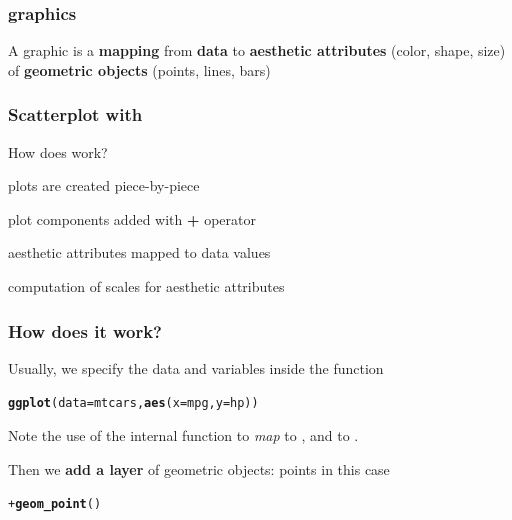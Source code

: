 \documentclass[12pt]{beamer}\usepackage[]{graphicx}\usepackage[]{color}
\makeatletter
\newcommand{\hlopt}[1]{\textcolor[rgb]{0,0,0}{#1}}%
\newcommand{\hlstd}[1]{\textcolor[rgb]{0.345,0.345,0.345}{#1}}%
\newcommand{\hlkwc}[1]{\textcolor[rgb]{0.333,0.667,0.333}{#1}}%
\newcommand{\hlkwd}[1]{\textcolor[rgb]{0.737,0.353,0.396}{\textbf{#1}}}%
\newenvironment{kframe}{%
 \def\at@end@of@kframe{}%
 \ifinner\ifhmode%
  \def\at@end@of@kframe{\end{minipage}}%
  \begin{minipage}{\columnwidth}%
 \fi\fi%
 \def\FrameCommand##1{\hskip\@totalleftmargin \hskip-\fboxsep
 \colorbox{shadecolor}{##1}\hskip-\fboxsep
     \hskip-\linewidth \hskip-\@totalleftmargin \hskip\columnwidth}%
 \MakeFramed {\advance\hsize-\width
   \@totalleftmargin\z@ \linewidth\hsize
   \@setminipage}}%
 {\par\unskip\endMakeFramed%
 \at@end@of@kframe}
\newenvironment{knitrout}{}{} %
\makeatother
\begin{document}

\begin{frame}
\frametitle{ graphics}

A graphic is a {\hilit \textbf{mapping}} from \textbf{data} to \textbf{aesthetic attributes} (color, shape, size) of \textbf{geometric objects} (points, lines, bars)
\eb

\bi
  \item {}
  \item {}
  \item {}
\ei

\end{frame}


\begin{frame}[fragile]
\frametitle{Scatterplot with }

How does  work?
\bi
  \item plots are created piece-by-piece
  \item plot components added with {\hilit \textbf{+}} operator
  \item aesthetic attributes mapped to data values
  \item computation of scales for aesthetic attributes
\ei

\end{frame}


\begin{frame}[fragile]
\frametitle{How does it work?}
Usually, we specify the data and variables inside the function {\hilit {}} 
\begin{knitrout}\footnotesize
{}\color{fgcolor}\begin{kframe}
\begin{alltt}
\hlkwd{ggplot}\hlstd{(}\hlkwc{data} \hlstd{= mtcars,} \hlkwd{aes}\hlstd{(}\hlkwc{x} \hlstd{= mpg,} \hlkwc{y} \hlstd{= hp))}
\end{alltt}
\end{kframe}
\end{knitrout}
Note the use of the internal function {\hilit {}} to \textit{map}  to , and  to .

\bigskip
Then we \textbf{add a layer} of geometric objects: points in this case
\begin{knitrout}\footnotesize
{}\color{fgcolor}\begin{kframe}
\begin{alltt}
\hlopt{+} \hlkwd{geom_point}\hlstd{()}
\end{alltt}
\end{kframe}
\end{knitrout}
\end{frame}
\end{document}
